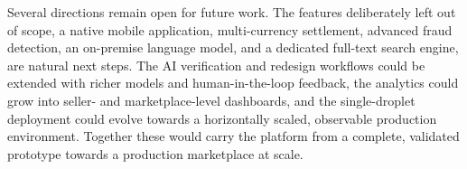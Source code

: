 Several directions remain open for future work. The features deliberately
left out of scope, a native mobile application, multi-currency
settlement, advanced fraud detection, an on-premise language model, and a
dedicated full-text search engine, are natural next steps. The AI
verification and redesign workflows could be extended with richer models
and human-in-the-loop feedback, the analytics could grow into seller- and
marketplace-level dashboards, and the single-droplet deployment could
evolve towards a horizontally scaled, observable production environment.
Together these would carry the platform from a complete, validated
prototype towards a production marketplace at scale.
